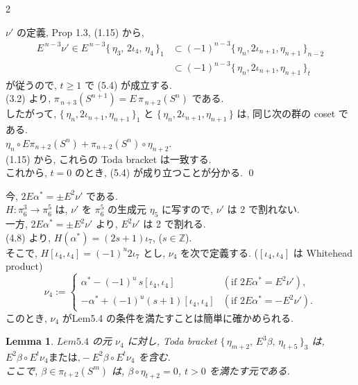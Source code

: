 \documentclass[10pt, leqno]{ltjsarticle}
\newcommand{\toda}[1]{\{\,#1\,\}}              %
\newcommand{\todai}[2][]{\{\,#2\,\}_{#1}}      %
\numberwithin{equation}{section}
\theoremstyle{plain}
\newtheorem{lemma}[theorem]{Lemma}
\theoremstyle{definition}
\theoremstyle{remark}
\begin{document}
\begin{paracol}{2}

\noindent
\(\nu'\) の定義, Prop 1.3, (1.15) から, 
\begin{align*}
E^{\,n-3}\nu'\in E^{\,n-3}\todai[1]{\eta_3,\,2\iota_{4},\,\eta_4}
& \subset(-1)^{n-3}\todai[n-2]{\eta_n, 2\iota_{n+1}, \eta_{n+1}}\\
& \subset(-1)^{n-3}\todai[t]{\eta_n, 2\iota_{n+1}, \eta_{n+1}}
\end{align*}
が従うので, \(t\ge1\) で (5.4) が成立する. \\
(3.2) より, \(\pi_{\,n+3}(S^{n+1})=E\,\pi_{\,n+2}(S^{n})\) である. \\
したがって,
\(\todai[1]{\eta_n,2\iota_{n+1},\eta_{n+1}}\) と
\(\toda{\eta_n,2\iota_{n+1},\eta_{n+1}}\)
は, 同じ次の群の coset である. \\
\(
\eta_n\circ E\pi_{n+2}(S^n) + \pi_{n+2}(S^n)\circ\eta_{n+2} .
\)\\
(1.15) から, これらの Toda bracket は一致する. \\
これから, \(t=0\) のとき, (5.4) が成り立つことが分かる. 
\qed

今, \(2E\alpha^{\ast}=\pm E^{2}\nu'\) である. \\
\(H:\pi^{3}_{6}\to \pi^{5}_{6}\) は,
\(\nu'\) を \(\pi_6^5\) の生成元 \(\eta_{5}\) に写すので, \(\nu'\) は 2 で割れない. \\
一方, \(2E\alpha^{\ast}=\pm E^{2}\nu'\) より,
\(E^{2}\nu'\) は 2 で割れる. \\
(4.8) より,
\(H(\alpha^{\ast})=(2s+1)\iota_{7}\), (\(s\in\mathbb Z\)). \\
そこで,
\(H[\iota_4,\iota_4]=(-1)^u 2\iota_7\) とし, 
\(\nu_4\) を次で定義する. 
(\([\iota_4,\iota_4]\) は Whitehead product)
\[
\nu_{4}:=
\begin{cases}
\alpha^{\ast}-(-1)^{u}\,s[\iota_4,\iota_4] 
& (\text{if } 2E\alpha^{\ast}=E^{2}\nu'),\\[1mm]
-\alpha^{\ast}+(-1)^{u}(s+1)[\iota_4,\iota_4] 
& (\text{if } 2E\alpha^{\ast}=-E^{2}\nu').
\end{cases}
\]
このとき, \(\nu_4\) がLem5.4 の条件を満たすことは簡単に確かめられる. 

\begin{lemma}\label{lem:5.5}
$Lem 5.4$ の元 \(\nu_{4}\) に対し, 
Toda bracket 
\(\todai[3]{\eta_{m+2},\,E^{3}\beta,\,\eta_{t+5}}\) は,\\
\(
E^{2}\beta\circ E^{t}\nu_{4}\text{または,} -E^{2}\beta\circ E^{t}\nu_{4}
\)
を含む. \\
ここで, \(\beta\in\pi_{t+2}(S^{m})\) は,
\(\beta\circ \eta_{t+2}=0\), \(t>0\) を満たす元である. 
\end{lemma}


\end{paracol}
\end{document}

